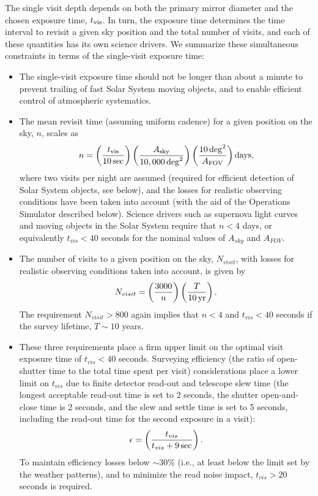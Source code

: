 \documentclass{emulateapj}
\begin{document}
The single visit depth depends on both the primary mirror diameter and the
chosen exposure time, $t_{\rm vis}$. In turn, the exposure time 
determines the time interval to revisit a given sky position and the total 
number of visits, and each of these quantities has its own science 
drivers. We summarize these simultaneous constraints in terms of the 
single-visit exposure time:
\begin{itemize}
\item  The single-visit exposure time should not be longer than about a minute to 
         prevent trailing of fast Solar System moving objects, and to enable efficient
         control of atmospheric systematics.
\item  The mean revisit time (assuming uniform cadence) for a given position 
         on the sky, $n$, scales as 
\begin{equation}
  n = \left( {t_{\rm vis} \over 10  \, {\rm sec}} \right)
      \left( { A_{\rm sky} \over 10,000  \, {\rm deg}^2} \right)
      \left( {10 \, {\rm deg}^2 \over  A_{\rm FOV}} \right) {\rm days},
\end{equation}
where two visits per night are assumed (required for efficient detection of 
Solar System objects, see below), and the losses for realistic observing conditions 
have been taken into account (with the aid of the Operations Simulator described below). 
Science drivers such as supernova light curves and moving objects in the Solar System require 
that $n<4$ days, or equivalently $t_{vis} < 40$ seconds for the nominal values 
of $A_{sky} $ and $A_{FOV}$. 
\item  The number of visits to a given position on the sky, $N_{visit}$,
with losses for realistic observing conditions taken into account,
is given by
\begin{equation}
      N_{visit} = \left( {3000 \over n} \right)
                    \left( { T \over 10 \, {\rm yr}} \right).
\end{equation}
The requirement $N_{visit}>800$ again implies that $n<4$ and 
$t_{vis} < 40$ seconds if the survey lifetime, $T \sim 10$ years. 
\item  These three requirements place a firm upper limit on the 
optimal visit exposure time of $t_{vis} < 40$ seconds. Surveying
efficiency (the ratio of open-shutter time to the total
time spent per visit) considerations place a lower limit on 
$t_{vis}$ due to finite detector read-out and telescope slew time (the longest 
acceptable read-out time is set to 2 seconds, the shutter open-and-close
time is 2 seconds, and the slew and settle time is set to 5 seconds, including 
the read-out time for the second exposure in a visit):
\begin{equation}
      \epsilon = \left( {t_{vis} \over t_{vis} + 9 \, {\rm sec}}\right).
\end{equation}
To maintain efficiency losses below $\sim$30\% (i.e., at least below the 
limit set by the weather patterns), and to minimize the read noise
impact, $t_{vis} > 20$ seconds is required. 
\end{itemize}
\end{document}
